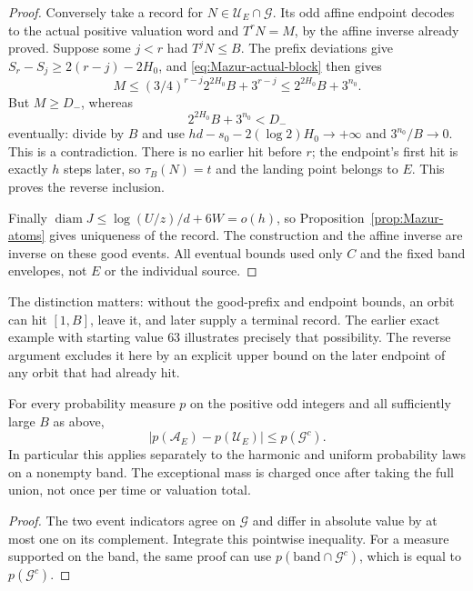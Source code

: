 \begin{proof}
Conversely take a record for $N\in\mathcal U_E\cap\mathcal G$.
Its odd affine endpoint decodes to the actual positive valuation word
and $T^rN=M$, by the affine inverse already proved.
Suppose some $j<r$ had $T^jN\le B$. The prefix deviations give
$S_r-S_j\ge2(r-j)-2H_0$, and \eqref{eq:Mazur-actual-block} then gives
\[
 M\le(3/4)^{r-j}2^{2H_0}B+3^{r-j}
      \le2^{2H_0}B+3^{n_0}.
\]
But $M\ge D_-$, whereas
\[
 2^{2H_0}B+3^{n_0}<D_-
\]
eventually: divide by $B$ and use
$hd-s_0-2(\log2)H_0\to+\infty$ and
$3^{n_0}/B\to0$.
This is a contradiction. There is no earlier hit before $r$;
the endpoint's first hit is exactly $h$ steps later, so $\tau_B(N)=t$
and the landing point belongs to $E$. This proves the reverse inclusion.

Finally $\operatorname{diam}J\le\log(U/z)/d+6W=o(h)$,
so Proposition~\ref{prop:Mazur-atoms} gives uniqueness of the record.
The construction and the affine inverse are inverse on these good events.
All eventual bounds used only $C$ and the fixed band envelopes,
not $E$ or the individual source.
\end{proof}

The distinction matters: without the good-prefix and endpoint bounds,
an orbit can hit $[1,B]$, leave it, and later supply a terminal record.
The earlier exact example with starting value $63$ illustrates precisely
that possibility. The reverse argument excludes it here by an explicit
upper bound on the later endpoint of any orbit that had already hit.

\begin{corollary}
\label{cor:Mazur-coverage-mass}
For every probability measure $p$ on the positive odd integers and
all sufficiently large $B$ as above,
\begin{equation}
 |p(\mathcal A_E)-p(\mathcal U_E)|\le p(\mathcal G^c).
 \label{eq:Mazur-coverage-mass}
\end{equation}
In particular this applies separately to the harmonic and uniform
probability laws on a nonempty band. The exceptional mass is charged
once after taking the full union, not once per time or valuation total.
\end{corollary}
\begin{proof}
The two event indicators agree on $\mathcal G$ and differ in absolute
value by at most one on its complement. Integrate this pointwise
inequality. For a measure supported on the band, the same proof can use
$p(\text{band}\cap\mathcal G^c)$, which is equal to $p(\mathcal G^c)$.
\end{proof}

